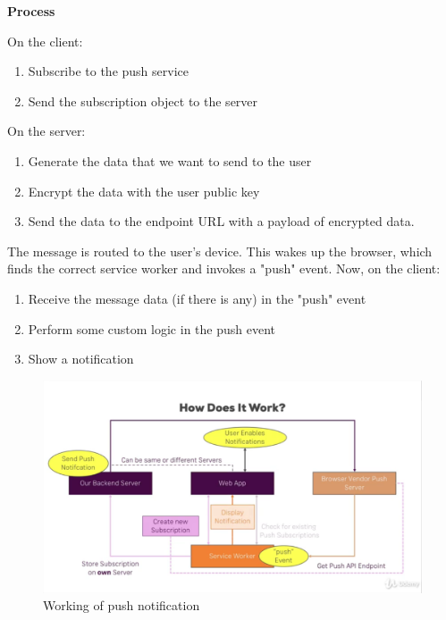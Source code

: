 \documentclass[14pt,a4paper,final]{extreport}
\begin{document}
\item \textbf{Process}
\item On the client:
\begin{enumerate}
    \item Subscribe to the push service
    \item Send the subscription object to the server
\end{enumerate}
On the server:
\begin{enumerate}
    \item Generate the data that we want to send to the user
    \item Encrypt the data with the user public key
    \item Send the data to the endpoint URL with a payload of encrypted data.
\end{enumerate}

The message is routed to the user's device. This wakes up the browser, which finds the correct service worker and invokes a "push" event. Now, on the client:
\begin{enumerate}
    \item Receive the message data (if there is any) in the "push" event
    \item Perform some custom logic in the push event
    \item Show a notification
\end{enumerate}
\newline
\newline
\item
\item 
\begin{figure}[h]
		\includegraphics[scale=.6]{ss3.png}
		\caption{Working of push notification}
	
    
\end{figure}
\end{document}
